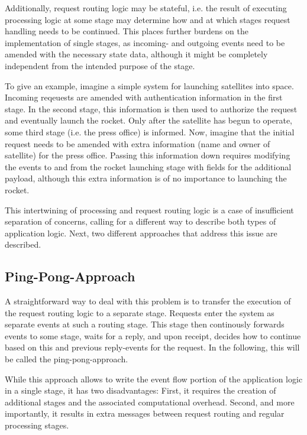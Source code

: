 \documentclass{sig-alternate}
\begin{document}
Additionally, request routing logic may be stateful, i.e. the result of executing processing logic
at some stage may determine how and at which stages request handling needs to be continued. This
places further burdens on the implementation of single stages, as incoming- and outgoing events need
to be amended with the necessary state data, although it might be completely independent from the
intended purpose of the stage.

To give an example, imagine a simple system for launching satellites into space. Incoming
reqeuests are amended with authentication information in the first stage. In the second stage, this
information is then used to authorize the request and eventually launch the rocket. Only after the
satellite has begun to operate, some third stage (i.e. the press office) is informed.  Now, imagine
that the initial request needs to be amended with extra information (name and owner of satellite)
for the press office.  Passing this information down requires modifying the events to and from
the rocket launching stage with fields for the additional payload, although this extra information
is of no importance to launching the rocket.

This intertwining of processing and request routing logic is a case of insufficient separation of
concerns, calling for a different way to describe both types of application logic.  Next, two 
different approaches that address this issue are described.


\subsection{Ping-Pong-Approach}

A straightforward way to deal with this problem is to transfer the execution of the request routing
logic to a separate stage. Requests enter the system as separate events at such a routing stage.
This stage then continously forwards events to some stage, waits for a reply, and upon receipt,
decides how to continue based on this and previous reply-events for the request. In the following,
this will be called the ping-pong-approach.

While this approach allows to write the event flow portion of the application logic in a single
stage, it has two disadvantages: First, it requires the creation of additional stages and the
associated computational overhead. Second, and more importantly, it results in extra messages
between request routing and regular processing stages.
\end{document}
